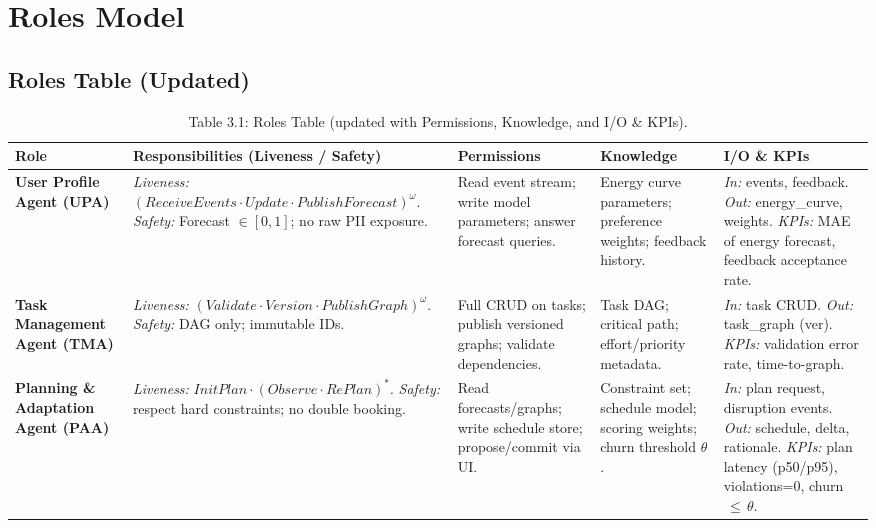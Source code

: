 \documentclass[12pt,oneside]{report}
\begin{document}
\chapter{Roles Model}
\section{Roles Table (Updated)}
\begin{table}[h]
\centering
\small
\renewcommand{\arraystretch}{1.15}
\begin{tabularx}{\textwidth}{@{}p{2.9cm}X p{2.7cm} p{2.7cm} p{2.9cm}@{}}
\toprule
\textbf{Role} & \textbf{Responsibilities (Liveness / Safety)} & \textbf{Permissions} & \textbf{Knowledge} & \textbf{I/O \& KPIs} \\
\midrule
\textbf{User Profile Agent (UPA)} &
\emph{Liveness:} $(ReceiveEvents \cdot Update \cdot PublishForecast)^\omega$. 
\emph{Safety:} Forecast $\in [0,1]$; no raw PII exposure. &
Read event stream; write model parameters; answer forecast queries. &
Energy curve parameters; preference weights; feedback history. &
\textit{In:} events, feedback. \textit{Out:} energy\_curve, weights. 
\textit{KPIs:} MAE of energy forecast, feedback acceptance rate. \\
\addlinespace
\textbf{Task Management Agent (TMA)} &
\emph{Liveness:} $(Validate \cdot Version \cdot PublishGraph)^\omega$.
\emph{Safety:} DAG only; immutable IDs. &
Full CRUD on tasks; publish versioned graphs; validate dependencies. &
Task DAG; critical path; effort/priority metadata. &
\textit{In:} task CRUD. \textit{Out:} task\_graph (ver). 
\textit{KPIs:} validation error rate, time-to-graph. \\
\addlinespace
\textbf{Planning \& Adaptation Agent (PAA)} &
\emph{Liveness:} $InitPlan \cdot (Observe \cdot RePlan)^*$. 
\emph{Safety:} respect hard constraints; no double booking. &
Read forecasts/graphs; write schedule store; propose/commit via UI. &
Constraint set; schedule model; scoring weights; churn threshold $\theta$. &
\textit{In:} plan request, disruption events. 
\textit{Out:} schedule, delta, rationale. 
\textit{KPIs:} plan latency (p50/p95), violations=0, churn$\,\le\,$$\theta$. \\
\bottomrule
\end{tabularx}
\caption{Table 3.1: Roles Table (updated with Permissions, Knowledge, and I/O \& KPIs).}
\label{tab:roles}
\end{table}


\end{document}
